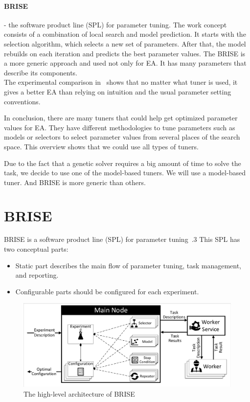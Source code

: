 \paragraph{BRISE} - the software product line (SPL) for parameter tuning. The work concept consists of a combination of local search and model prediction. It starts with the selection algorithm, which selects a new set of parameters. After that, the model rebuilds on each iteration and predicts the best parameter values. The BRISE is a more generic approach and used not only for EA. It has many parameters that describe its components. \\

The experimental comparison in~\cite{smit2009comparing} shows that no matter what tuner is used, it gives a better EA than relying on intuition and the usual parameter setting conventions.

In conclusion, there are many tuners that could help get optimized parameter values for EA. They have different methodologies to tune parameters such as models or selectors to select parameter values from several places of the search space. This overview shows that we could use all types of tuners. 

Due to the fact that a genetic solver requires a big amount of time to solve the task, we decide to use one of the model-based tuners. We will use a model-based tuner. And BRISE is more generic than others. 

\section{BRISE}\label{sec:BRISE}

BRISE is a software product line (SPL) for parameter tuning~\cite{pukhkaiev19}.3
This SPL has two conceptual parts:

\begin{itemize}
	\item Static part describes the main flow of parameter tuning, task management, and reporting.
	\item Configurable parts should be configured for each experiment.
\end{itemize}

\begin{figure}
	\centering
	\includegraphics[width=\textwidth]{images/BRISEarch.pdf}
	\caption[The high-level architecture of BRISE]{The high-level architecture of BRISE}
	\label{fig:BRISEarch}
\end{figure}

